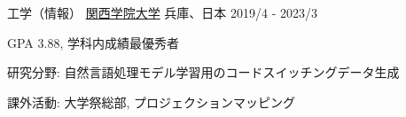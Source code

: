

\begin{cventries}

  \cventry
    {工学（情報）} %
    {\href{https://www.kwansei.ac.jp/index.html}{関西学院大学}} %
    {兵庫、日本} %
    {2019/4 - 2023/3} %
    {
      \begin{cvitems} %
        \item {GPA 3.88, 学科内成績最優秀者}
        \item {研究分野: 自然言語処理モデル学習用のコードスイッチングデータ生成}
        \item {課外活動: 大学祭総部, プロジェクションマッピング}
      \end{cvitems}
    }

\end{cventries}
